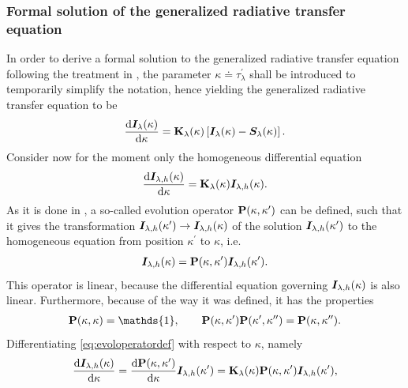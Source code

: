 \documentclass[a4paper,11pt]{report}
\begin{document}
\subsubsection{Formal solution of the generalized radiative transfer equation}
In order to derive a formal solution to the generalized radiative transfer equation following the treatment in \cite[pp.152-157]{delToroIniesta.2003}, the parameter $\kappa \doteq \tau_\lambda^\prime$ shall be introduced to temporarily simplify the notation, hence yielding the generalized radiative transfer equation to be \begin{equation}\label{eq:generalizedradtransferkappa}
\frac{\mathrm{d}\bm{I}_\lambda(\kappa)}{\mathrm{d}\kappa} = \boldsymbol{\mathbf{K}}_\lambda(\kappa)\left[\bm{I}_\lambda(\kappa)-\bm{S}_\lambda(\kappa)\right].
\end{equation} Consider now for the moment only the homogeneous differential equation \begin{equation}\label{eq:homogeneralizedradeq}
\frac{\mathrm{d}\bm{I}_{\lambda,h}(\kappa)}{\mathrm{d}\kappa} = \boldsymbol{\mathbf{K}}_\lambda(\kappa)\bm{I}_{\lambda,h}(\kappa).
\end{equation} As it is done in \cite[p.152]{delToroIniesta.2003}, a so-called evolution operator $\boldsymbol{\mathbf{P}}(\kappa, \kappa^\prime)$ can be defined, such that it gives the transformation $\bm{I}_{\lambda,h}(\kappa^\prime)\rightarrow \bm{I}_{\lambda,h}(\kappa)$ of the solution $\bm{I}_{\lambda,h}(\kappa^\prime)$ to the homogeneous equation from position $\kappa^\prime$ to $\kappa$, i.e. \begin{equation}\label{eq:evoloperatordef}
\bm{I}_{\lambda,h}(\kappa) = \boldsymbol{\mathbf{P}}(\kappa,\kappa^\prime)\bm{I}_{\lambda,h}(\kappa^\prime).
\end{equation} This operator is linear, because the differential equation governing $\bm{I}_{\lambda,h}(\kappa)$ is also linear. Furthermore, because of the way it was defined, it has the properties \begin{gather}
\matr{P}(\kappa,\kappa) = \mathds{1}, \qquad \matr{P}(\kappa,\kappa^\prime)\matr{P}(\kappa^\prime, \kappa^{\prime\prime}) = \matr{P}(\kappa,\kappa^{\prime\prime}). 
\end{gather} Differentiating \cref{eq:evoloperatordef} with respect to $\kappa$, namely \begin{align}
\begin{aligned}
\frac{\mathrm{d}\vect{I}_{\lambda,h}(\kappa)}{\mathrm{d}\kappa} = \frac{\mathrm{d}\matr{P}(\kappa,\kappa^\prime)}{\mathrm{d}\kappa}\vect{I}_{\lambda,h}(\kappa^\prime) = \matr{K}_\lambda(\kappa)\matr{P}(\kappa,\kappa^\prime)\vect{I}_{\lambda,h}(\kappa^\prime),

\end{aligned}
\end{align}
\end{document}
